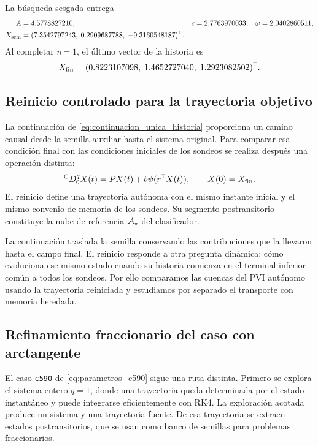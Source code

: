 La búsqueda sesgada entrega
\begin{equation}
\begin{aligned}
A&=4.5778827210,&
c&=2.7763970033,&
\omega&=2.0402860511,\\
X_{\mathrm{sem}}&=
(7.3542797243,\;0.2909687788,\;-9.3160548187)^{\mathsf T}.
\end{aligned}
\label{eq:datos_semilla_no_suave}
\end{equation}
Al completar \(\eta=1\), el último vector de la historia es
\begin{equation}
X_{\mathrm{fin}}=
(0.8223107098,\;1.4652727040,\;1.2923082502)^{\mathsf T}.
\label{eq:endpoint_no_suave}
\end{equation}

\subsection{Reinicio controlado para la trayectoria objetivo}
\label{sec:reinicio_objetivo}

La continuación de \cref{eq:continuacion_unica_historia} proporciona un camino
causal desde la semilla auxiliar hasta el sistema original. Para
comparar esa condición final con las condiciones iniciales de los sondeos se
realiza después una operación distinta:
\begin{equation}
{}^{\mathrm C}D_{0}^{q}X(t)=PX(t)+b\psi(r^{\mathsf T}X(t)),
\qquad X(0)=X_{\mathrm{fin}}.
\label{eq:reset_objetivo_no_suave}
\end{equation}
El reinicio define una trayectoria autónoma con el mismo instante inicial y
el mismo convenio de memoria de los sondeos. Su segmento postransitorio
constituye la nube de referencia \(\mathcal A_\star\) del clasificador.

La continuación traslada la semilla conservando las contribuciones que
la llevaron hasta el campo final. El reinicio responde a otra pregunta
dinámica: cómo evoluciona ese mismo estado cuando su historia comienza en el
terminal inferior común a todos los sondeos. Por ello comparamos las cuencas
del PVI autónomo usando la trayectoria reiniciada y estudiamos por separado
el transporte con memoria heredada.

\subsection{Refinamiento fraccionario del caso con arctangente}
\label{sec:refinamiento_c590}

El caso \texttt{c590} de \cref{eq:parametros_c590} sigue una ruta distinta.
Primero se explora el sistema entero \(q=1\), donde una trayectoria queda
determinada por el estado instantáneo y puede integrarse eficientemente con
RK4. La exploración acotada produce un sistema y una trayectoria fuente. De
esa trayectoria se extraen estados postransitorios, que se usan como banco de
semillas para problemas fraccionarios.


